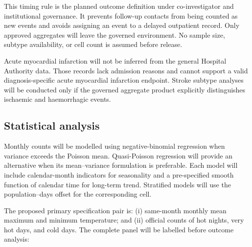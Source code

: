 \documentclass[11pt,a4paper]{article}
\begin{document}
This timing rule is the planned outcome definition under co-investigator and institutional governance. It prevents follow-up contacts from being counted as new events and avoids assigning an event to a delayed outpatient record. Only approved aggregates will leave the governed environment. No sample size, subtype availability, or cell count is assumed before release.

Acute myocardial infarction will not be inferred from the general Hospital Authority data. Those records lack admission reasons and cannot support a valid diagnosis-specific acute myocardial infarction endpoint. Stroke subtype analyses will be conducted only if the governed aggregate product explicitly distinguishes ischaemic and haemorrhagic events.

\subsection{Statistical analysis}

Monthly counts will be modelled using negative-binomial regression when variance exceeds the Poisson mean. Quasi-Poisson regression will provide an alternative when its mean--variance formulation is preferable. Each model will include calendar-month indicators for seasonality and a pre-specified smooth function of calendar time for long-term trend. Stratified models will use the population--days offset for the corresponding cell.

The proposed primary specification pair is: (i) same-month monthly mean maximum and minimum temperature; and (ii) official counts of hot nights, very hot days, and cold days. The complete panel will be labelled before outcome analysis:
\end{document}
